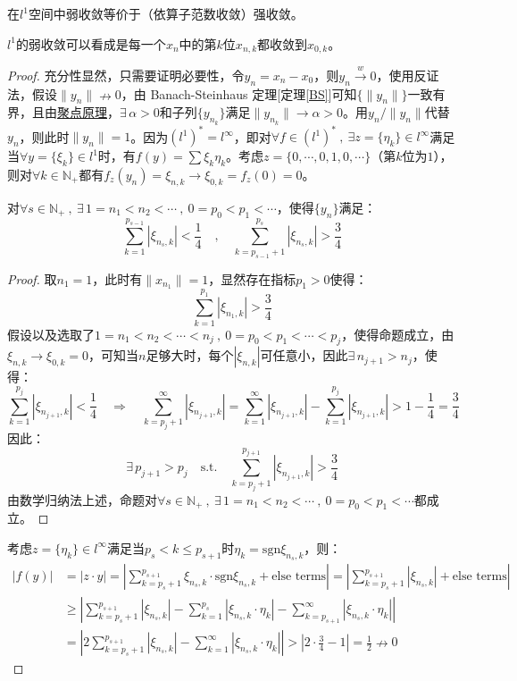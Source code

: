 \begin{theorem}[Schur 定理]
在$l^1$空间中弱收敛等价于（依算子范数收敛）强收敛。
\end{theorem}
\begin{remark}
\quad $l^1$的弱收敛可以看成是每一个$x_n$中的第$k$位$x_{n,k}$都收敛到$x_{0,k}$。
\end{remark}
\begin{proof}
充分性显然，只需要证明必要性，令$y_n=x_n-x_0$，则$y_n \xrightarrow{w} 0$，使用反证法，假设$\|y_n\| \nrightarrow 0$，由 Banach-Steinhaus 定理[定理\ref{BS}]可知$\{\|y_n\|\}$一致有界，且由\href{https://math.fandom.com/zh/wiki/Bolzano-Weierstrass_%E5%AE%9A%E7%90%86}{聚点原理}，$\exists \, \alpha>0$和子列$\{y_{n_k}\}$满足$\|y_{n_k}\|\to\alpha>0$。用$y_n/\|y_n\|$代替$y_n$，则此时$\|y_n\|=1$。因为$(l^1)^*=l^{\infty}$，即对$\forall f \in (l^1)^* \ , \ \exists z=\{\eta_k\} \in l^{\infty}$满足当$\forall y=\{\xi_k\}\in l^1$时，有$f(y)=\sum\xi_k\eta_k$。考虑$z=\{0,\cdots,0,1,0,\cdots\}$（第$k$位为$1$），则对$\forall k \in \mathbb{N}_+$都有$f_z(y_n)=\xi_{n,k} \to \xi_{0,k}=f_z(0)=0$。
\begin{proposition}
对$\forall s \in \mathbb{N_+} \ , \ \exists \, 1=n_1<n_2<\cdots \ , \ 0=p_0<p_1<\cdots$，使得$\{y_n\}$满足：
\[\sum_{k=1}^{p_{s-1}}|\xi_{n_s,k}|<\frac{1}{4} \quad , \quad \sum_{k=p_{s-1}+1}^{p_s}|\xi_{n_s,k}|>\frac{3}{4}\]
\begin{proof}
取$n_1=1$，此时有$\|x_{n_1}\|=1$，显然存在指标$p_1>0$使得：
\[\sum_{k=1}^{p_1}|\xi_{n_1,k}|>\frac{3}{4}\]
假设以及选取了$1=n_1<n_2<\cdots<n_j \ , \ 0=p_0<p_1<\cdots<p_j$，使得命题成立，由$\xi_{n,k} \to \xi_{0,k}=0$，可知当$n$足够大时，每个$|\xi_{n,k}|$可任意小，因此$\exists \, n_{j+1}>n_j$，使得：
\[\sum_{k=1}^{p_j}|\xi_{n_{j+1},k}|<\frac{1}{4} \quad \Rightarrow \quad \sum_{k=p_j+1}^{\infty}|\xi_{n_{j+1},k}|=\sum_{k=1}^{\infty}|\xi_{n_{j+1},k}|-\sum_{k=1}^{p_j}|\xi_{n_{j+1},k}|>1-\frac{1}{4}=\frac{3}{4}\]
因此：
\[\exists \, p_{j+1}>p_j \quad \text{s.t.} \quad \sum_{k=p_j+1}^{p_{j+1}}|\xi_{n_{j+1},k}|>\frac{3}{4}\]
由数学归纳法上述，命题对$\forall s \in \mathbb{N_+} \ , \ \exists \, 1=n_1<n_2<\cdots \ , \ 0=p_0<p_1<\cdots$都成立。
\end{proof}
\end{proposition}
考虑$z=\{\eta_k\} \in l^{\infty}$满足当$p_s<k\leq p_{s+1}$时$\eta_k=\text{sgn}\xi_{n_s,k}$，则：
\[\begin{aligned}
|f(y)|&=|z \cdot y|=\left|\sum_{k=p_s+1}^{p_{s+1}}\xi_{n_s,k}\cdot\text{sgn}\xi_{n_s,k}+\text{else terms}\right|=\left|\sum_{k=p_s+1}^{p_{s+1}}|\xi_{n_s,k}|+\text{else terms}\right|\\
&\geq\left|\sum_{k=p_s+1}^{p_{s+1}}|\xi_{n_s,k}|-\sum_{k=1}^{p_s}|\xi_{n_s,k}\cdot\eta_k|-\sum_{k=p_{s+1}}^{\infty}|\xi_{n_s,k}\cdot\eta_k|\right|\\
&=\left|2\sum_{k=p_s+1}^{p_{s+1}}|\xi_{n_s,k}|-\sum_{k=1}^{\infty}|\xi_{n_s,k}\cdot\eta_k|\right|>\left|2\cdot\frac{3}{4}-1\right|=\frac{1}{2} \nrightarrow 0
\end{aligned}\]
\end{proof}

